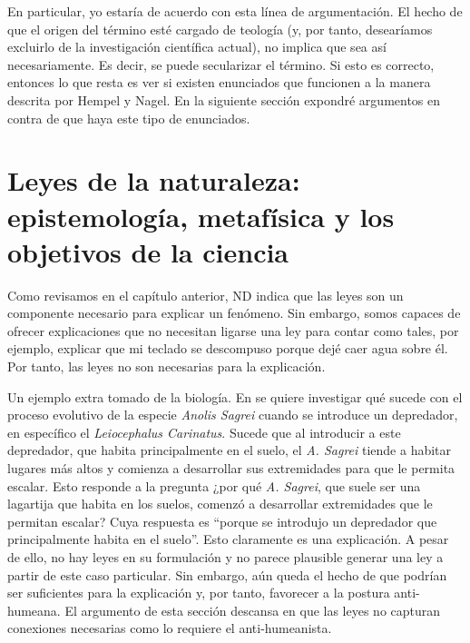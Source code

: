 En particular, yo estaría de acuerdo con esta línea de argumentación. El hecho de que el origen del término esté cargado de teología (y, por tanto, desearíamos excluirlo de la investigación científica actual), no implica que sea así necesariamente. Es decir, se puede secularizar el término. Si esto es correcto, entonces lo que resta es ver si existen enunciados que funcionen a la manera descrita por Hempel y Nagel. En la siguiente sección expondré argumentos en contra de que haya este tipo de enunciados.

\section{Leyes de la naturaleza: epistemología, metafísica y los objetivos de la ciencia}

\noindent Como revisamos en el capítulo anterior, ND indica que las leyes son un componente necesario para explicar un fenómeno. Sin embargo, somos capaces de ofrecer explicaciones que no necesitan ligarse una ley para contar como tales, por ejemplo, explicar que mi teclado se descompuso porque dejé caer agua sobre él. Por tanto, las leyes no son necesarias para la explicación.

Un ejemplo extra tomado de la biología. En \cite{Losos2004} se quiere investigar qué sucede con el proceso evolutivo de la especie \textit{Anolis Sagrei} cuando se introduce un depredador, en específico el \textit{Leiocephalus Carinatus}. Sucede que al introducir a este depredador, que habita principalmente en el suelo, el \textit{A. Sagrei} tiende a habitar lugares más altos y comienza a desarrollar sus extremidades para que le permita escalar. Esto responde a la pregunta ¿por qué \textit{A. Sagrei}, que suele ser una lagartija que habita en los suelos, comenzó a desarrollar extremidades que le permitan escalar? Cuya respuesta es ``porque se introdujo un depredador que principalmente habita en el suelo''. Esto claramente es una explicación. A pesar de ello, no hay leyes en su formulación y no parece plausible generar una ley a partir de este caso particular. Sin embargo, aún queda el hecho de que podrían ser suficientes para la explicación y, por tanto, favorecer a la postura anti-humeana. El argumento de esta sección descansa en que las leyes no capturan conexiones necesarias como lo requiere el anti-humeanista.

